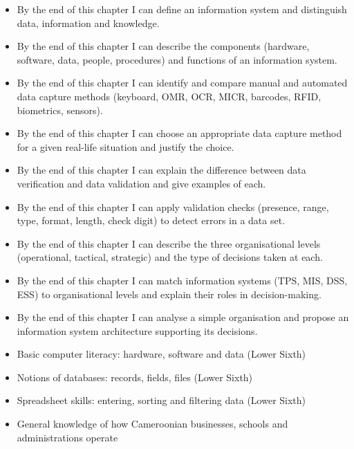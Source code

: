 \documentclass[11pt]{article}
\begin{document}
\begin{objectifs}
\begin{itemize}
\item By the end of this chapter I can define an information system and distinguish data, information and knowledge.
\item By the end of this chapter I can describe the components (hardware, software, data, people, procedures) and functions of an information system.
\item By the end of this chapter I can identify and compare manual and automated data capture methods (keyboard, OMR, OCR, MICR, barcodes, RFID, biometrics, sensors).
\item By the end of this chapter I can choose an appropriate data capture method for a given real-life situation and justify the choice.
\item By the end of this chapter I can explain the difference between data verification and data validation and give examples of each.
\item By the end of this chapter I can apply validation checks (presence, range, type, format, length, check digit) to detect errors in a data set.
\item By the end of this chapter I can describe the three organisational levels (operational, tactical, strategic) and the type of decisions taken at each.
\item By the end of this chapter I can match information systems (TPS, MIS, DSS, ESS) to organisational levels and explain their roles in decision-making.
\item By the end of this chapter I can analyse a simple organisation and propose an information system architecture supporting its decisions.
\end{itemize}
\end{objectifs}

\begin{prerequis}
\begin{itemize}
\item Basic computer literacy: hardware, software and data (Lower Sixth)
\item Notions of databases: records, fields, files (Lower Sixth)
\item Spreadsheet skills: entering, sorting and filtering data (Lower Sixth)
\item General knowledge of how Cameroonian businesses, schools and administrations operate
\end{itemize}
\end{prerequis}
\end{document}
